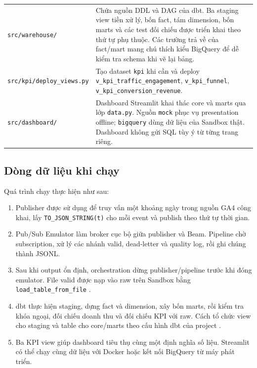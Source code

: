 \begin{xltabular}{\textwidth}{>{\raggedright\arraybackslash}p{6.3cm} >{\raggedright\arraybackslash}X}
\texttt{src/warehouse/}
& Chứa nguồn DDL và DAG của dbt. Ba staging view tiền xử lý, bốn fact, tám dimension, bốn marts và các test đối chiếu được triển khai theo thứ tự phụ thuộc. Các trường trả về của fact/mart mang chú thích kiểu BigQuery để dễ kiểm tra schema khi vẽ lại bảng. \\

\texttt{src/kpi/deploy\_views.py}
& Tạo dataset \texttt{kpi} khi cần và deploy \texttt{v\_kpi\_traffic\_engagement}, \texttt{v\_kpi\_funnel}, \texttt{v\_kpi\_conversion\_revenue}. \\

\texttt{src/dashboard/}
& Dashboard Streamlit khai thác core và marts qua lớp \texttt{data.py}. Nguồn \texttt{mock} phục vụ presentation offline; \texttt{bigquery} dùng dữ liệu của Sandbox thật. Dashboard không gửi SQL tùy ý từ từng trang riêng. \\
\end{xltabular}

\subsection{Dòng dữ liệu khi chạy}

Quá trình chạy thực hiện như sau:
\begin{enumerate}
  \item Publisher được sử dụng để truy vấn một khoảng ngày trong nguồn GA4 công khai, lấy \texttt{TO\_JSON\_STRING(t)} cho mỗi event và publish theo thứ tự thời gian.
  \item Pub/Sub Emulator làm broker cục bộ giữa publisher và Beam. Pipeline chờ subscription, xử lý các nhánh valid, dead-letter và quality log, rồi ghi chúng thành JSONL.
  \item Sau khi output ổn định, orchestration dừng publisher/pipeline trước khi đóng emulator. File valid được nạp vào raw trên Sandbox bằng \texttt{load\_table\_from\_file} \parencite{bigquery-sandbox}.
  \item dbt thực hiện staging, dựng fact và dimension, xây bốn marts, rồi kiểm tra khóa ngoại, đối chiếu doanh thu và đối chiếu KPI với raw. Cách tổ chức view cho staging và table cho core/marts theo cấu hình dbt của project \parencite{dbt-materializations}.
  \item Ba KPI view giúp dashboard tiêu thụ cùng một định nghĩa số liệu. Streamlit có thể chạy cùng dữ liệu với Docker hoặc kết nối BigQuery từ máy phát triển.
\end{enumerate}

